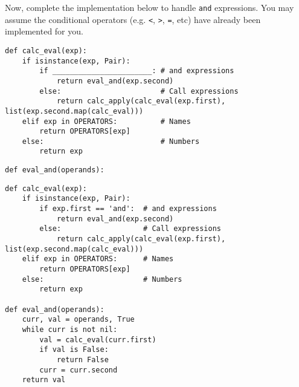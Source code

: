 \begin{subparts}
\subpart Now, complete the implementation below to handle {\tt and}
expressions. You may assume the conditional operators (e.g. {\tt <}, {\tt >},
{\tt =}, etc) have already been implemented for you.
\begin{lstlisting}
def calc_eval(exp):
    if isinstance(exp, Pair):
        if _______________________: # and expressions
            return eval_and(exp.second)
        else:                       # Call expressions
            return calc_apply(calc_eval(exp.first), list(exp.second.map(calc_eval)))
    elif exp in OPERATORS:          # Names
        return OPERATORS[exp]
    else:                           # Numbers
        return exp
\end{lstlisting}
\begin{lstlisting}
def eval_and(operands):
\end{lstlisting}
\begin{solution}[0in]
\begin{lstlisting}
def calc_eval(exp):
    if isinstance(exp, Pair):
        if exp.first == 'and':  # and expressions
            return eval_and(exp.second)
        else:                   # Call expressions
            return calc_apply(calc_eval(exp.first), list(exp.second.map(calc_eval)))
    elif exp in OPERATORS:      # Names
        return OPERATORS[exp]
    else:                       # Numbers
        return exp

def eval_and(operands):
    curr, val = operands, True
    while curr is not nil:
        val = calc_eval(curr.first)
        if val is False:
            return False
        curr = curr.second
    return val
\end{lstlisting}
\end{solution}
\end{subparts}
